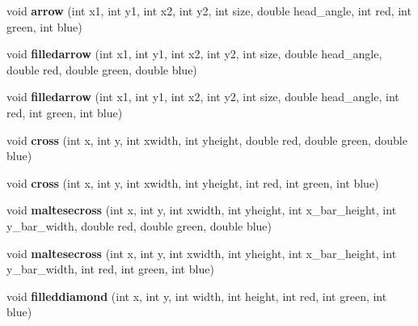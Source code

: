 \begin{DoxyCompactItemize}
\item 
\hypertarget{classpngwriter_a62beeb73030ac4428db491824609ddf7}{}void {\bfseries arrow} (int x1, int y1, int x2, int y2, int size, double head\+\_\+angle, int red, int green, int blue)\label{classpngwriter_a62beeb73030ac4428db491824609ddf7}

\item 
\hypertarget{classpngwriter_ab95b572867d21501386b0b36dba04409}{}void {\bfseries filledarrow} (int x1, int y1, int x2, int y2, int size, double head\+\_\+angle, double red, double green, double blue)\label{classpngwriter_ab95b572867d21501386b0b36dba04409}

\item 
\hypertarget{classpngwriter_ad0fe14377cd9cb1bad0de91ad2cf9545}{}void {\bfseries filledarrow} (int x1, int y1, int x2, int y2, int size, double head\+\_\+angle, int red, int green, int blue)\label{classpngwriter_ad0fe14377cd9cb1bad0de91ad2cf9545}

\item 
\hypertarget{classpngwriter_a708950a06eb01311db58a9643e0915b7}{}void {\bfseries cross} (int x, int y, int xwidth, int yheight, double red, double green, double blue)\label{classpngwriter_a708950a06eb01311db58a9643e0915b7}

\item 
\hypertarget{classpngwriter_ad1df120d2f6d1a6c9c22c47577d3ff7f}{}void {\bfseries cross} (int x, int y, int xwidth, int yheight, int red, int green, int blue)\label{classpngwriter_ad1df120d2f6d1a6c9c22c47577d3ff7f}

\item 
\hypertarget{classpngwriter_a1aff2c494d83fe19e7708ae86ae3845f}{}void {\bfseries maltesecross} (int x, int y, int xwidth, int yheight, int x\+\_\+bar\+\_\+height, int y\+\_\+bar\+\_\+width, double red, double green, double blue)\label{classpngwriter_a1aff2c494d83fe19e7708ae86ae3845f}

\item 
\hypertarget{classpngwriter_a37889982d9c1a9d5b0d905e47a0f9a7d}{}void {\bfseries maltesecross} (int x, int y, int xwidth, int yheight, int x\+\_\+bar\+\_\+height, int y\+\_\+bar\+\_\+width, int red, int green, int blue)\label{classpngwriter_a37889982d9c1a9d5b0d905e47a0f9a7d}

\item 
\hypertarget{classpngwriter_a6e7bb349e2d96339b6a0912790bfc7e2}{}void {\bfseries filleddiamond} (int x, int y, int width, int height, int red, int green, int blue)\label{classpngwriter_a6e7bb349e2d96339b6a0912790bfc7e2}


\end{DoxyCompactItemize}
